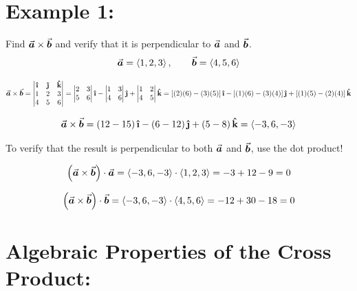 
\section*{Example 1:} %

Find \(\a \times \b\) and verify that it is perpendicular to \(\a\) and \(\b\).
\[ \a = \<1, 2, 3\>, \qquad \b = \<4, 5, 6\> \]



\[
\a \times \b = \begin{vmatrix}
\ihat & \jhat & \khat\\
1 & 2 & 3\\
4 & 5 & 6
\end{vmatrix}
 = \begin{vmatrix}
 2 & 3\\
 5 & 6
 \end{vmatrix}
 \ihat
 - \begin{vmatrix}
 1 & 3\\
 4 & 6
 \end{vmatrix}
 \jhat
 + \begin{vmatrix}
 1 & 2\\
 4 & 5
 \end{vmatrix}
 \khat
 = \left[(2) (6) - (3)( 5)\right] \ihat - \left[ (1) (6) - (3)( 4)\right] \jhat + \left[ (1)( 5) - (2) (4)\right] \khat
\]

\[
\a \times \b = \left(12 - 15\right) \ihat - \left( 6 - 12 \right) \jhat + \left( 5 - 8 \right) \khat = \<-3, 6, -3\>
\]

\vfill

To verify that the result is perpendicular to both \(\a\) and \(\b\), use the dot product!

\[
\left(\a \times \b\right) \cdot \a = \<-3, 6, -3\> \cdot \<1, 2, 3\> = -3 + 12 -9 = 0
\]

\[
\left(\a \times \b\right) \cdot \b = \<-3, 6, -3\> \cdot \<4, 5, 6\> = -12+30-18 = 0
\]

\vfill

\pagebreak


\section*{Algebraic Properties of the Cross Product:}


